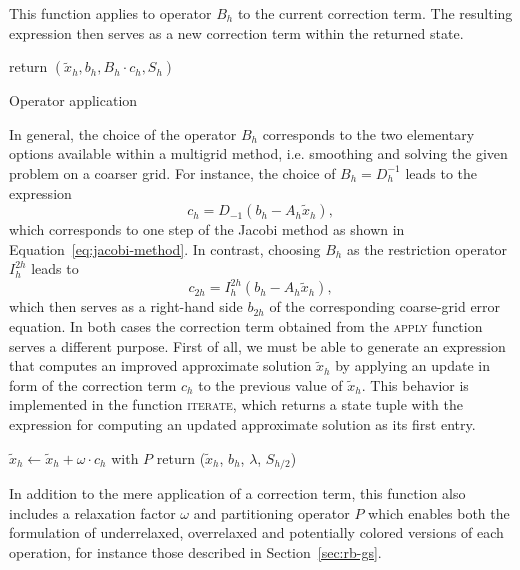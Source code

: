 This function applies to operator $B_h$ to the current correction term. 
The resulting expression then serves as a new correction term within the returned state.
\begin{algorithm}
	\begin{algorithmic}
		\State return $(\tilde{x}_h, b_h, B_h\cdot c_h, S_h)$
		\EndFunction
	\end{algorithmic}
\caption{Operator application}
\end{algorithm}
In general, the choice of the operator $B_h$ corresponds to the two elementary options available within a multigrid method, i.e. smoothing and solving the given problem on a coarser grid.
For instance, the choice of $B_h = D_h^{-1}$ leads to the expression
\begin{equation*}
	c_h = D_{-1} (b_h - A_h \tilde{x}_h),
\end{equation*}
which corresponds to one step of the Jacobi method as shown in Equation~\ref{eq:jacobi-method}.
In contrast, choosing $B_h$ as the restriction operator $I_h^{2h}$ leads to
\begin{equation*}
	c_{2h} = I_{h}^{2h} (b_h - A_h \tilde{x}_h),
\end{equation*}
which then serves as a right-hand side $b_{2h}$ of the corresponding coarse-grid error equation.
In both cases the correction term obtained from the \textsc{apply} function serves a different purpose.
First of all, we must be able to generate an expression that computes an improved approximate solution $\tilde{x}_h$ by applying an update in form of the correction term $c_h$ to the previous value of $\tilde{x}_h$. 
This behavior is implemented in the function \textsc{iterate}, which returns a state tuple with the expression for computing an updated approximate solution as its first entry.
\begin{algorithm}
	\begin{algorithmic}
		\Function{iterate}{$\omega$, $P$, ($\tilde{x}_h$, $b_h$, $c_h$, $S_{h/2}$)}
			\State $\tilde{x}_h \gets \tilde{x}_h + \omega \cdot c_h$ with $P$
			\State return ($\tilde{x}_h$, $b_h$, $\lambda$, $S_{h/2}$) 
		\EndFunction
	\end{algorithmic}
\end{algorithm}
In addition to the mere application of a correction term, this function also includes a relaxation factor $\omega$ and partitioning operator $P$ which enables both the formulation of underrelaxed, overrelaxed and potentially colored versions of each operation, for instance those described in Section~\ref{sec:rb-gs}.
